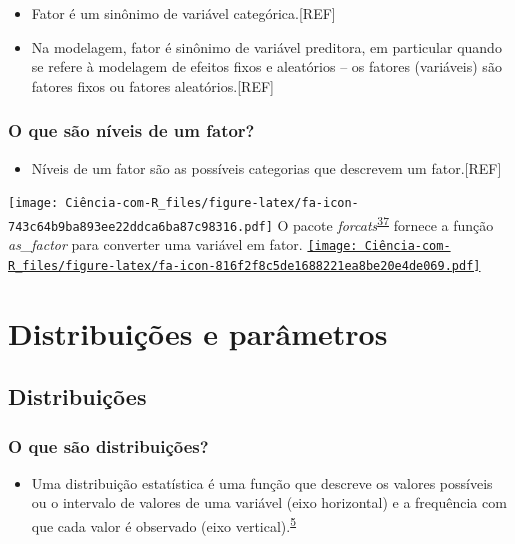 \documentclass[
]{book}
\providecommand{\tightlist}{%
  \setlength{\itemsep}{0pt}\setlength{\parskip}{0pt}}
\begin{document}
\begin{itemize}
\item
  Fator é um sinônimo de variável categórica.{[}REF{]}
\item
  Na modelagem, fator é sinônimo de variável preditora, em particular quando se refere à modelagem de efeitos fixos e aleatórios -- os fatores (variáveis) são fatores fixos ou fatores aleatórios.{[}REF{]}
\end{itemize}

\hypertarget{o-que-suxe3o-nuxedveis-de-um-fator}{%
\subsection{O que são níveis de um fator?}\label{o-que-suxe3o-nuxedveis-de-um-fator}}

\begin{itemize}
\tightlist
\item
  Níveis de um fator são as possíveis categorias que descrevem um fator.{[}REF{]}
\end{itemize}

\texttt{[image: Ciência-com-R\_files/figure-latex/fa-icon-743c64b9ba893ee22ddca6ba87c98316.pdf]} O pacote \emph{forcats}\textsuperscript{\protect\hyperlink{ref-forcats}{37}} fornece a função \emph{as\_factor} para converter uma variável em fator. \href{https://cran.r-project.org/web/packages/forcats/index.html}{\texttt{[image: Ciência-com-R\_files/figure-latex/fa-icon-816f2f8c5de1688221ea8be20e4de069.pdf]}}

\hypertarget{distribuicoes-parametros}{%
\chapter{\texorpdfstring{\textbf{Distribuições e parâmetros}}{Distribuições e parâmetros}}\label{distribuicoes-parametros}}

\hypertarget{distribuicoes}{%
\section{Distribuições}\label{distribuicoes}}

\hypertarget{o-que-suxe3o-distribuiuxe7uxf5es}{%
\subsection{O que são distribuições?}\label{o-que-suxe3o-distribuiuxe7uxf5es}}

\begin{itemize}
\tightlist
\item
  Uma distribuição estatística é uma função que descreve os valores possíveis ou o intervalo de valores de uma variável (eixo horizontal) e a frequência com que cada valor é observado (eixo vertical).\textsuperscript{\protect\hyperlink{ref-vetter2017}{5}}
\end{itemize}
\end{document}
